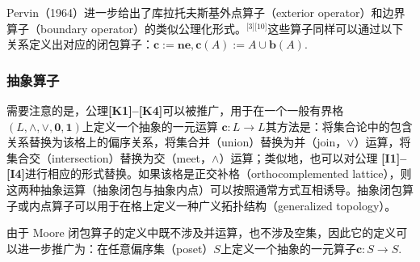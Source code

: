 Pervin（1964）进一步给出了库拉托夫斯基外点算子（exterior operator）和边界算子（boundary operator）的类似公理化形式。\(^\text{[3][10]}\)这些算子同样可以通过以下关系定义出对应的闭包算子：$\mathbf{c} := \mathbf{n e},\mathbf{c}(A) := A \cup \mathbf{b}(A)$.
\subsubsection{抽象算子}
需要注意的是，公理\textbf{[K1]–[K4]}可以被推广，用于在一个一般有界格
$(L, \land, \lor, \mathbf{0}, \mathbf{1})$上定义一个抽象的一元运算
$\mathbf{c} : L \to L$其方法是：将集合论中的包含关系替换为该格上的偏序关系，将集合并（union）替换为并（join，$\lor$）运算，将集合交（intersection）替换为交（meet，$\land$）运算；类似地，也可以对公理 \textbf{[I1]–[I4]}进行相应的形式替换。如果该格是正交补格（orthocomplemented lattice），则这两种抽象运算（抽象闭包与抽象内点）可以按照通常方式互相诱导。抽象闭包算子或内点算子可以用于在格上定义一种广义拓扑结构（generalized topology）。

由于 Moore 闭包算子的定义中既不涉及并运算，也不涉及空集，因此它的定义可以进一步推广为：在任意偏序集（poset）$S$上定义一个抽象的一元算子$\mathbf{c} : S \to S$.

